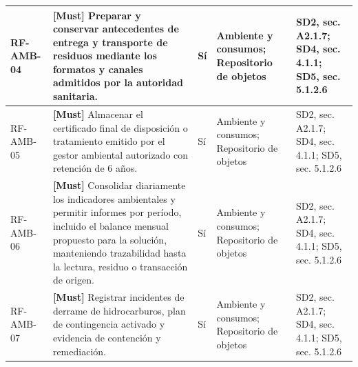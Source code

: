 \begin{paginaHorizontalSynaptix}
\begin{longtable}{|L{0.09\AnchoMatrizTDoce}|L{0.385\AnchoMatrizTDoce}|L{0.065\AnchoMatrizTDoce}|L{0.18\AnchoMatrizTDoce}|L{0.28\AnchoMatrizTDoce}|}
RF-\allowbreak{}AMB-\allowbreak{}04 &
\textbf{[Must]} Preparar y conservar antecedentes de entrega y transporte de residuos mediante los formatos y canales admitidos por la autoridad sanitaria. &
Sí &
Ambiente y consumos; Repositorio de objetos &
SD2, sec. A2.1.7; SD4, sec. 4.1.1; SD5, sec. 5.1.2.6 \\ \hline

RF-\allowbreak{}AMB-\allowbreak{}05 &
\textbf{[Must]} Almacenar el certificado final de disposición o tratamiento emitido por el gestor ambiental autorizado con retención de 6 años. &
Sí &
Ambiente y consumos; Repositorio de objetos &
SD2, sec. A2.1.7; SD4, sec. 4.1.1; SD5, sec. 5.1.2.6 \\ \hline

RF-\allowbreak{}AMB-\allowbreak{}06 &
\textbf{[Must]} Consolidar diariamente los indicadores ambientales y permitir informes por período, incluido el balance mensual propuesto para la solución, manteniendo trazabilidad hasta la lectura, residuo o transacción de origen. &
Sí &
Ambiente y consumos; Repositorio de objetos &
SD2, sec. A2.1.7; SD4, sec. 4.1.1; SD5, sec. 5.1.2.6 \\ \hline

RF-\allowbreak{}AMB-\allowbreak{}07 &
\textbf{[Must]} Registrar incidentes de derrame de hidrocarburos, plan de contingencia activado y evidencia de contención y remediación. &
Sí &
Ambiente y consumos; Repositorio de objetos &
SD2, sec. A2.1.7; SD4, sec. 4.1.1; SD5, sec. 5.1.2.6 \\ \hline
\end{longtable}



\end{paginaHorizontalSynaptix}

